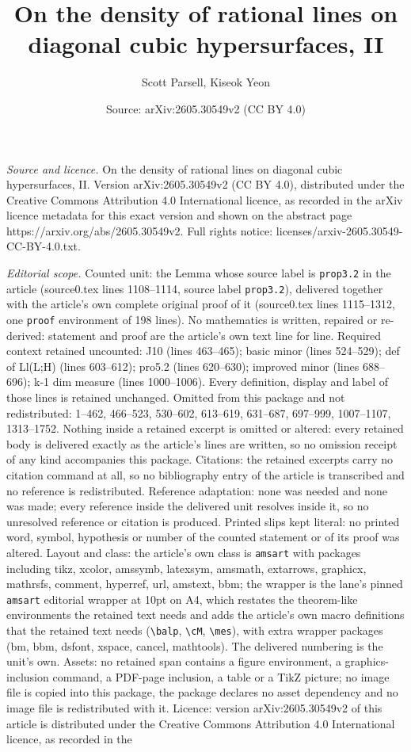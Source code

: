 \documentclass[10pt,a4paper]{amsart}
\title[On the density of rational lines on diagonal cubic hypersurf]{On the density of rational lines on diagonal cubic hypersurfaces, II}
\author{Scott Parsell, Kiseok Yeon}
\date{Source: arXiv:2605.30549v2 (CC BY 4.0)}
\begin{document}
\maketitle

\noindent\emph{Source and licence.} On the density of rational lines on diagonal cubic hypersurfaces, II. Version arXiv:2605.30549v2 (CC BY 4.0), distributed under the Creative Commons Attribution 4.0 International licence, as recorded in the arXiv licence metadata for this exact version and shown on the abstract page https://arxiv.org/abs/2605.30549v2. Full rights notice: licenses/arxiv-2605.30549-CC-BY-4.0.txt.\par\smallskip

\noindent\textit{Editorial scope.} Counted unit: the Lemma whose source label is \texttt{prop3.2} in the article (source0.tex lines 1108--1114, source label \texttt{prop3.2}), delivered together with the article's own complete original proof of it (source0.tex lines 1115--1312, one \texttt{proof} environment of 198 lines). No mathematics is written, repaired or re-derived: statement and proof are the article's own text line for line. Required context retained uncounted: J10 (lines 463--465); basic minor (lines 524--529); def of Ll(L;H) (lines 603--612); pro5.2 (lines 620--630); improved minor (lines 688--696); k-1 dim measure (lines 1000--1006). Every definition, display and label of those lines is retained unchanged. Omitted from this package and not redistributed: 1--462, 466--523, 530--602, 613--619, 631--687, 697--999, 1007--1107, 1313--1752. Nothing inside a retained excerpt is omitted or altered: every retained body is delivered exactly as the article's lines are written, so no omission receipt of any kind accompanies this package. Citations: the retained excerpts carry no citation command at all, so no bibliography entry of the article is transcribed and no reference is redistributed. Reference adaptation: none was needed and none was made; every reference inside the delivered unit resolves inside it, so no unresolved reference or citation is produced. Printed slips kept literal: no printed word, symbol, hypothesis or number of the counted statement or of its proof was altered. Layout and class: the article's own class is \texttt{amsart} with packages including tikz, xcolor, amssymb, latexsym, amsmath, extarrows, graphicx, mathrsfs, comment, hyperref, url, amstext, bbm; the wrapper is the lane's pinned \texttt{amsart} editorial wrapper at 10pt on A4, which restates the theorem-like environments the retained text needs and adds the article's own macro definitions that the retained text needs (\texttt{\textbackslash balp}, \texttt{\textbackslash cM}, \texttt{\textbackslash mes}), with extra wrapper packages (bm, bbm, dsfont, xspace, cancel, mathtools). The delivered numbering is the unit's own. Assets: no retained span contains a figure environment, a graphics-inclusion command, a PDF-page inclusion, a table or a TikZ picture; no image file is copied into this package, the package declares no asset dependency and no image file is redistributed with it. Licence: version arXiv:2605.30549v2 of this article is distributed under the Creative Commons Attribution 4.0 International licence, as recorded in the 
\end{document}
